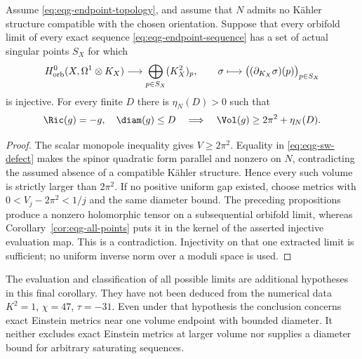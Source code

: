 \begin{corollary}
\label{cor:eqg-conditional-gap}
Assume \eqref{eq:eqg-endpoint-topology}, and assume that $N$ admits
no Kähler structure compatible with the chosen orientation.
Suppose that every orbifold limit of every exact sequence
\eqref{eq:eqg-endpoint-sequence} has a set of actual singular points
$S_X$ for which
\[
 H^0_{\rm orb}(X,\Omega^1\otimes K_X)
 \longrightarrow\bigoplus_{p\in S_X}(K_X^2)_p,
 \qquad
 \sigma\longmapsto\bigl((\partial_{K_X}\sigma)(p)\bigr)_{p\in S_X}
\]
is injective.  For every finite $D$ there is $\eta_N(D)>0$ such that
\[
 \Ric(g)=-g,\quad\diam(g)\leq D
 \quad\Longrightarrow\quad
 \Vol(g)\geq2\pi^2+\eta_N(D).
\]
\end{corollary}

\begin{proof}
The scalar monopole inequality gives $V\geq2\pi^2$.
Equality in \eqref{eq:eqg-sw-defect} makes the spinor quadratic form
parallel and nonzero on $N$, contradicting the assumed absence of
a compatible Kähler structure.  Hence every such volume is strictly
larger than $2\pi^2$.
If no positive uniform gap existed, choose metrics with
$0<V_j-2\pi^2<1/j$ and the same diameter bound.  The preceding
propositions produce a nonzero holomorphic tensor on a subsequential
orbifold limit, whereas Corollary~\ref{cor:eqg-all-points} puts it in
the kernel of the asserted injective evaluation map.  This is a
contradiction.  Injectivity on that one extracted limit is sufficient;
no uniform inverse norm over a moduli space is used.
\end{proof}

The evaluation and classification of all possible limits are additional
hypotheses in this final corollary.  They have not been deduced from
the numerical data $K^2=1$, $\chi=47$, $\tau=-31$.
Even under that hypothesis the conclusion concerns exact Einstein
metrics near one volume endpoint with bounded diameter.  It neither
excludes exact Einstein metrics at larger volume nor supplies a
diameter bound for arbitrary saturating sequences.
